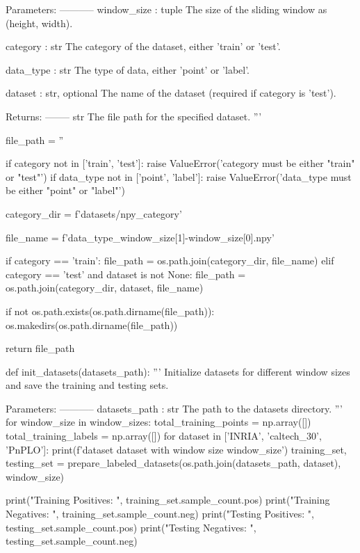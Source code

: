 \begin{pythoncode}
    Parameters:
    -----------
    window_size : tuple
        The size of the sliding window as (height, width).
    
    category : str
        The category of the dataset, either 'train' or 'test'.
    
    data_type : str
        The type of data, either 'point' or 'label'.
    
    dataset : str, optional
        The name of the dataset (required if category is 'test').

    Returns:
    --------
    str
        The file path for the specified dataset.
    '''

    file_path = ''

    if category not in ['train', 'test']:
        raise ValueError('category must be either "train" or "test"')
    if data_type not in ['point', 'label']:
        raise ValueError('data_type must be either "point" or "label"')

    category_dir = f'datasets/npy_{category}'

    file_name = f'{data_type}_{window_size[1]}-{window_size[0]}.npy'

    if category == 'train':
        file_path = os.path.join(category_dir, file_name)
    elif category == 'test' and dataset is not None:
        file_path = os.path.join(category_dir, dataset, file_name)

    if not os.path.exists(os.path.dirname(file_path)):
        os.makedirs(os.path.dirname(file_path))

    return file_path


def init_datasets(datasets_path):
    '''
    Initialize datasets for different window sizes and save the training and testing sets.

    Parameters:
    -----------
    datasets_path : str
        The path to the datasets directory.
    '''
    for window_size in window_sizes:
        total_training_points = np.array([])
        total_training_labels = np.array([])
        for dataset in ['INRIA', 'caltech_30', 'PnPLO']:
            print(f'\n\nInitializing dataset {dataset} with window size {window_size}\n')
            training_set, testing_set = prepare_labeled_datasets(os.path.join(datasets_path, dataset), window_size)

            print("Training Positives: ", training_set.sample_count.pos)
            print("Training Negatives: ", training_set.sample_count.neg)
            print("Testing Positives: ", testing_set.sample_count.pos)
            print("Testing Negatives: ", testing_set.sample_count.neg)


\end{pythoncode}
